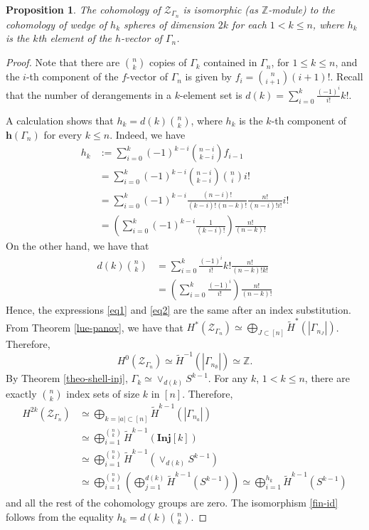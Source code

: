 \documentclass[a4paper,11pt]{article}
\newtheorem{proposition}[theorem]{Proposition}
\theoremstyle{definition}
\newcommand{\inj}{\mathbf{Inj}}
\newcommand{\Z}{\mathbb{Z}}
\newcommand{\ZZ}{\mathcal{Z}}
\begin{document}
\begin{proposition}\label{add-co-inj}
The cohomology  of $\ZZ_{\Gamma_n}$ is isomorphic (as $\Z$-module) to the cohomology of wedge of $h_k$ spheres of dimension $2k$ for each $1 < k \leq n$, where $h_k$ is the $k$th element of the $h$-vector of $\Gamma_n$.
\end{proposition}
\begin{proof}
Note that there are $n \choose k$  copies of $\Gamma_k$ contained in $\Gamma_n$, for $1 \leq k \leq n$, and the $i$-th component of the $f$-vector of $\Gamma_n$ is given by $f_i = {n \choose i+1}(i+1)!$. Recall that the number of derangements in a $k$-element set is $d(k) = \sum_{i=0}^{k} \frac{(-1)^{i}}{i!} k!$.

A calculation shows that $h_k = d(k){n \choose k}$, where $h_k$ is the $k$-th component of $\textbf{h}(\Gamma_n)$ for every $k \leq n$. Indeed, we have 
    \begin{align}
        h_k & := \sum_{i=0}^{k} (-1)^{k-i} {n-i \choose k-i}f_{i-1} \\
        & = \sum_{i=0}^{k} (-1)^{k-i} {n-i \choose k-i}{n \choose i} i! \\
        & = \sum_{i=0}^{k} (-1)^{k-i} \frac{(n-i)!}{(k-i)!(n-k)!}\frac{n!}{(n-i)! i!} i! \\
        & = \left(\sum_{i=0}^{k} (-1)^{k-i} \frac{1}{(k-i)!}\right) \frac{n!}{(n-k)!} \label{eq1}
    \end{align}
On the other hand, we have that 
    \begin{align}
        d(k){n \choose k} & = \sum_{i=0}^{k} \frac{(-1)^{i}}{i!} k! \frac{n!}{(n-k)!k!} \\
        & = \left(\sum_{i=0}^{k} \frac{(-1)^{i}}{i!} \right) \frac{n!}{(n-k)!} \label{eq2}
    \end{align}
Hence, the expressions \eqref{eq1} and \eqref{eq2} are the same  after an index substitution. From Theorem \ref{lue-panov}, we have that $H^*(\ZZ_{\Gamma_n}) \simeq \bigoplus_{J \subset [n]} \tilde{H}^*(|\Gamma_{n_J}|)$. Therefore, 
\[
H^0(\ZZ_{\Gamma_n}) \simeq \tilde{H}^{-1}(|\Gamma_{n_\emptyset}|) \simeq \Z.
\] 
By Theorem \ref{theo-shell-inj}, $\Gamma_k \simeq \vee_{d(k)}S^{k-1}$. For any $k$, $1 < k \leq n$, there are exactly ${n \choose k}$ index sets of size $k$ in $[n]$. Therefore,
    \begin{align}
        H^{2k}(\ZZ_{\Gamma_n}) & \simeq \bigoplus_{k= |a| \subset [n]} \tilde{H}^{k-1}(|\Gamma_{n_a}|) \\ 
        & \simeq \bigoplus_{i = 1}^{{n \choose k}} \tilde{H}^{k-1}(\inj[k])\\
        & \simeq \bigoplus_{i = 1}^{{n \choose k}} \tilde{H}^{k-1}(\vee_{d(k)} S^{k-1})\\
        & \simeq \bigoplus_{i = 1}^{{n \choose k}} \left(\bigoplus_{j=1}^{d(k)}\tilde{H}^{k-1}(S^{k-1}) \right) \simeq \bigoplus_{i = 1}^{h_k} \tilde{H}^{k-1}(S^{k-1})  \label{fin-id}
    \end{align}
and all the rest of the cohomology groups are zero. The isomorphism \eqref{fin-id} follows from the equality $h_k = d(k){n \choose k}$. 
\end{proof}
	
\end{document}
